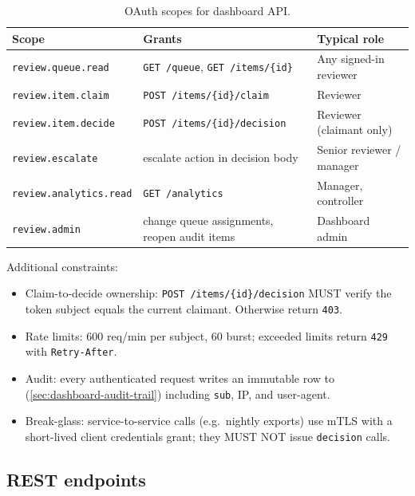 \begin{table}[htbp]
\centering
\caption{OAuth scopes for dashboard API.}
\label{tab:dashboard-api-scopes}
\footnotesize
\begin{tabularx}{\linewidth}{@{}l X X@{}}
\toprule
\textbf{Scope} & \textbf{Grants} & \textbf{Typical role} \\ \midrule
\texttt{review.queue.read} & \texttt{GET /queue}, \texttt{GET /items/\{id\}} & Any signed-in reviewer \\
\texttt{review.item.claim} & \texttt{POST /items/\{id\}/claim} & Reviewer \\
\texttt{review.item.decide} & \texttt{POST /items/\{id\}/decision} & Reviewer (claimant only) \\
\texttt{review.escalate} & escalate action in decision body & Senior reviewer / manager \\
\texttt{review.analytics.read} & \texttt{GET /analytics} & Manager, controller \\
\texttt{review.admin} & change queue assignments, reopen audit items & Dashboard admin \\
\bottomrule
\end{tabularx}
\end{table}

\noindent
Additional constraints:
\begin{itemize}
  \item Claim-to-decide ownership: \texttt{POST
        /items/\{id\}/decision} MUST verify the token subject equals
        the current claimant. Otherwise return \texttt{403}.
  \item Rate limits: 600 req/min per subject, 60 burst; exceeded
        limits return \texttt{429} with \texttt{Retry-After}.
  \item Audit: every authenticated request writes an immutable
        row to 
        (\cref{sec:dashboard-audit-trail}) including
        \texttt{sub}, IP, and user-agent.
  \item Break-glass: service-to-service calls (e.g.\ nightly
        exports) use mTLS with a short-lived client credentials
        grant; they MUST NOT issue \texttt{decision} calls.
\end{itemize}

\subsection{REST endpoints}

